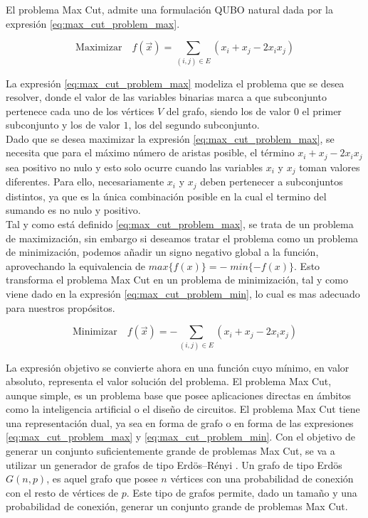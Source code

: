 \newpage

El problema Max Cut, admite una formulación \mbox{QUBO} natural dada por la expresión \ref{eq:max_cut_problem_max}.

\begin{equation}
    \text{Maximizar} \quad f(\Vec{x}) = \sum_{(i,j) \in E} (x_i + x_j -2x_ix_j)
    \label{eq:max_cut_problem_max}
\end{equation}

La expresión \ref{eq:max_cut_problem_max} modeliza el problema que se desea resolver, donde el valor de las variables binarias marca a que subconjunto pertenece cada uno de los vértices $V$ del grafo, siendo los de valor $0$ el primer subconjunto y los de valor $1$, los del segundo subconjunto. \\


Dado que se desea maximizar la expresión \ref{eq:max_cut_problem_max}, se necesita que para  el máximo número de aristas posible, el término $x_i + x_j -2 x_i x_j$  sea positivo no nulo y esto solo ocurre cuando las variables $x_i$ y $x_j$ toman valores diferentes. Para ello, necesariamente $x_i$ y $x_j$ deben pertenecer a subconjuntos distintos, ya que es la única combinación posible en la cual el termino del sumando es no nulo y positivo. \\

Tal y como está definido \ref{eq:max_cut_problem_max}, se trata de un problema de maximización, sin embargo si deseamos tratar el problema como un problema de minimización, podemos añadir un signo negativo global a la función, aprovechando la equivalencia de $max\{ f(x)\} = - \; min\{ - f(x) \}$. Esto transforma el problema Max Cut en un problema de minimización, tal y como viene dado en la expresión \ref{eq:max_cut_problem_min}, lo cual es mas adecuado para nuestros propósitos.

\begin{equation}
    \text{Minimizar} \quad f(\Vec{x}) = - \sum_{(i,j) \in E} (x_i + x_j - 2x_i x_j)
    \label{eq:max_cut_problem_min}
\end{equation}

La expresión objetivo se convierte ahora en una función cuyo mínimo, en valor absoluto, representa el valor solución del problema. El problema Max Cut, aunque simple, es un problema base que posee aplicaciones directas en ámbitos como la inteligencia artificial o el diseño de circuitos. El problema Max Cut tiene una representación dual, ya sea en forma de grafo o en forma de las expresiones \ref{eq:max_cut_problem_max} y \ref{eq:max_cut_problem_min}. Con el objetivo de generar un conjunto suficientemente grande de problemas Max Cut, se va a utilizar un generador de grafos de tipo Erdös–Rényi \citep{li}. Un grafo de tipo Erdös $G(n,p)$, es aquel grafo que posee $n$ vértices con una probabilidad de conexión con el resto de vértices de $p$. Este tipo de grafos permite, dado un tamaño y una probabilidad de conexión, generar un conjunto grande de problemas Max Cut. 

